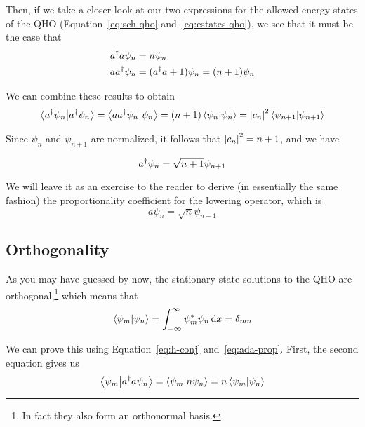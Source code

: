 Then, if we take a closer look at our two expressions for the allowed energy states of the QHO (Equation~\ref{eq:sch-qho} and~\ref{eq:estates-qho}), we see that it must be the case that 
\begin{align}
	a^{\dagger} a \psi_n &= n\psi_n \label{eq:ada-prop} \\
	a a^{\dagger} \psi_n &= (a^{\dagger} a + 1)\psi_n = (n+1)\psi_n \label{eq:aad-prop}
\end{align} 

We can combine these results to obtain
\begin{equation*}
	\braket{a^{\dagger} \psi_n}{a^{\dagger} \psi_n} = \braket{aa^{\dagger} \psi_n}{\psi_n} = (n+1) \braket{\psi_n}{\psi_n} = \abs{c_n}^2\braket{\psi_{n+1}}{\psi_{n+1}}
\end{equation*}

Since $\psi_n$ and $\psi_{n+1}$ are normalized, it follows that $\abs{c_n}^2 = n+1$, and we have
\begin{tcolorbox}[title = Raising operator proportionality] \vspace{-2ex}
	\begin{equation}
		a^{\dagger} \psi_n = \sqrt{n+1} \psi_{n+1} \label{eq:ad-prop}
	\end{equation}
\end{tcolorbox}

We will leave it as an exercise to the reader to derive (in essentially the same fashion) the proportionality coefficient for the lowering operator, which is 
\begin{equation}
	a \psi_n = \sqrt{n} \psi_{n-1} \label{eq:a-prop}
\end{equation}


\subsection{Orthogonality}
As you may have guessed by now, the stationary state solutions to the QHO are orthogonal,\footnote{In fact they also form an orthonormal basis.} which means that 
\begin{equation}
	\braket{\psi_m}{\psi_n} = \int_{-\infty}^{\infty} \psi_m^*\psi_n \dd{x} = \delta_{mn} \label{eq:ortho_qho}
\end{equation}

We can prove this using Equation~\ref{eq:h-conj} and~\ref{eq:ada-prop}. First, the second equation gives us
\begin{equation}
	\braket{\psi_m}{a^{\dagger} a \psi_n} = \braket{\psi_m}{n\psi_n} = n\braket{\psi_m}{\psi_n} \label{eq:qho-orth1}
\end{equation}

